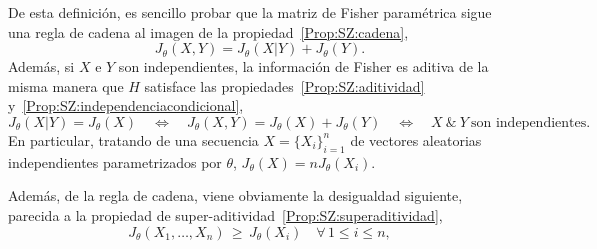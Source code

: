 De esta definici\'on,  es sencillo probar que la  matriz de Fisher param\'etrica
sigue una regla de cadena al imagen de la propiedad~\ref{Prop:SZ:cadena},
%
\[
J_\theta(X,Y) = J_\theta(X|Y) + J_\theta(Y).
\]
%
Adem\'as, si $X$ e $Y$ son independientes, la informaci\'on de Fisher es aditiva
de la  misma manera  que $H$ satisface  las propiedades~\ref{Prop:SZ:aditividad}
y~\ref{Prop:SZ:independenciacondicional}, \ie
%
\[
J_\theta(X|Y)  =   J_\theta(X)  \quad  \Leftrightarrow  \quad   J_\theta(X,Y)  =
J_\theta(X) + J_\theta(Y) \quad \Leftrightarrow \quad  X \: \& \: Y \: \mbox{son
independientes.}
\]
%
En particular,  tratando de una  secuencia $X =  \{ X_i \}_{i=1}^n$  de vectores
aleatorias  independientes   parametrizados  por  $\theta$,   $J_\theta(X)  =  n
J_\theta(X_i)$.

Adem\'as,  de la  regla de  cadena, viene  obviamente la  desigualdad siguiente,
parecida a la propiedad de super-aditividad~\ref{Prop:SZ:superaditividad},
%
\[
J_\theta(X_1,\ldots,X_n) \, \ge \,  J_\theta(X_i) \quad \forall \, 1 \le i \le n,
\]
%
